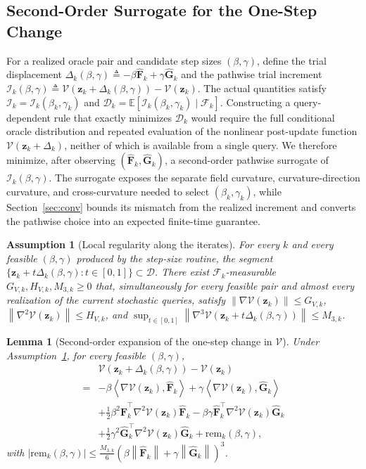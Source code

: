 \documentclass{article}
\newtheorem{lemma}{Lemma}
\newtheorem{assumption}{Assumption}
\theoremstyle{remark}
\newcommand{\E}{\mathbb{E}}
\newcommand{\inner}[2]{\left\langle #1,#2\right\rangle}
\newcommand{\norm}[1]{\left\lVert #1\right\rVert}
\newcommand{\cD}{\mathcal{D}}
\newcommand{\bz}{\boldsymbol{z}}
\newcommand{\hatF}{\widehat{\boldsymbol{F}}}
\newcommand{\hatG}{\widehat{\boldsymbol{G}}}
\newcommand{\Vk}{\mathcal{V}}
\begin{document}
\subsection{Second-Order Surrogate for the One-Step Change}\label{subsec:two_direction}
For a realized oracle pair and candidate step sizes $(\beta,\gamma)$, define the trial displacement $\Delta_{k}(\beta,\gamma)\triangleq -\beta\hatF_{k}+\gamma\hatG_{k}$ and the pathwise trial increment $\mathscr I_k(\beta,\gamma)\triangleq\Vk(\bz_k+\Delta_k(\beta,\gamma))-\Vk(\bz_k)$.
The actual quantities satisfy $\mathscr I_k=\mathscr I_k(\beta_k,\gamma_k)$ and $\mathscr D_k=\E[\mathscr I_k(\beta_k,\gamma_k)\mid\mathscr F_k]$.
Constructing a query-dependent rule that exactly minimizes $\mathscr D_k$ would require the full conditional oracle distribution and repeated evaluation of the nonlinear post-update function $\Vk(\bz_k+\Delta_k)$, neither of which is available from a single query.
We therefore minimize, after observing $(\hatF_k,\hatG_k)$, a second-order pathwise surrogate of $\mathscr I_k(\beta,\gamma)$.
The surrogate exposes the separate field curvature, curvature-direction curvature, and cross-curvature needed to select $(\beta_k,\gamma_k)$, while Section~\ref{sec:conv} bounds its mismatch from the realized increment and converts the pathwise choice into an expected finite-time guarantee.

\begin{assumption}[Local regularity along the iterates]\label{ass:local_reg}
For every $k$ and every feasible $(\beta,\gamma)$ produced by the step-size routine, the segment $\{\bz_{k}+t\Delta_{k}(\beta,\gamma):t\in[0,1]\}\subset\cD$.
There exist $\mathscr{F}_{k}$-measurable $G_{V,k},H_{V,k},M_{3,k}\ge 0$ that, simultaneously for every feasible pair and almost every realization of the current stochastic queries, satisfy $\norm{\nabla\Vk(\bz_{k})}\le G_{V,k}$, $\norm{\nabla^{2}\Vk(\bz_{k})}\le H_{V,k}$, and $\sup_{t\in[0,1]}\norm{\nabla^{3}\Vk(\bz_{k}+t\Delta_{k}(\beta,\gamma))} \le M_{3,k}$.
\end{assumption}

\begin{lemma}[Second-order expansion of the one-step change in $\Vk$]\label{lem:drift_taylor}
Under Assumption~\ref{ass:local_reg}, for every feasible $(\beta,\gamma)$,
\begin{equation}\label{eq:drift_taylor}
\begin{aligned}
&\Vk(\bz_{k}+\Delta_{k}(\beta,\gamma))-\Vk(\bz_{k}) \\
={}&-\beta\inner{\nabla\Vk(\bz_k)}{\hatF_k}
+\gamma\inner{\nabla\Vk(\bz_k)}{\hatG_k}\\
&+\tfrac12\beta^2\hatF_k^\top\nabla^2\Vk(\bz_k)\hatF_k
-\beta\gamma\hatF_k^\top\nabla^2\Vk(\bz_k)\hatG_k\\
&+\tfrac12\gamma^2\hatG_k^\top\nabla^2\Vk(\bz_k)\hatG_k
+\mathrm{rem}_{k}(\beta,\gamma),
\end{aligned}
\end{equation}
with $\lvert \mathrm{rem}_{k}(\beta,\gamma)\rvert\le\frac{M_{3,k}}{6}(\beta\norm{\hatF_{k}}+\gamma\norm{\hatG_{k}})^{3}$.
\end{lemma}
\end{document}
